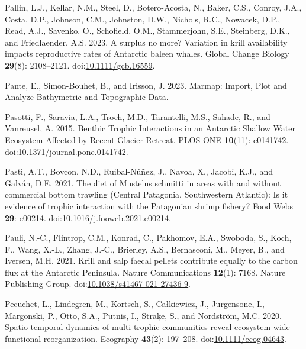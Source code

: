 \documentclass[
]{article}
\newlength{\cslhangindent}
\newenvironment{CSLReferences}[2] %
 {\begin{list}{}{%
  \setlength{\itemindent}{0pt}
  \setlength{\leftmargin}{0pt}
  \setlength{\parsep}{0pt}
  \ifodd #1
   \setlength{\leftmargin}{\cslhangindent}
   \setlength{\itemindent}{-1\cslhangindent}
  \fi
  \setlength{\itemsep}{#2\baselineskip}}}
 {\end{list}}
\begin{document}
\begin{CSLReferences}{1}{0}
Pallin, L.J., Kellar, N.M., Steel, D., Botero-Acosta, N., Baker, C.S.,
Conroy, J.A., Costa, D.P., Johnson, C.M., Johnston, D.W., Nichols, R.C.,
Nowacek, D.P., Read, A.J., Savenko, O., Schofield, O.M., Stammerjohn,
S.E., Steinberg, D.K., and Friedlaender, A.S. 2023. A surplus no more?
{Variation} in krill availability impacts reproductive rates of
{Antarctic} baleen whales. Global Change Biology \textbf{29}(8):
2108--2121.
doi:\href{https://doi.org/10.1111/gcb.16559}{10.1111/gcb.16559}.

Pante, E., Simon-Bouhet, B., and Irisson, J. 2023. Marmap: {Import},
{Plot} and {Analyze Bathymetric} and {Topographic Data}.

Pasotti, F., Saravia, L.A., Troch, M.D., Tarantelli, M.S., Sahade, R.,
and Vanreusel, A. 2015. Benthic {Trophic Interactions} in an {Antarctic
Shallow Water Ecosystem Affected} by {Recent Glacier Retreat}. PLOS ONE
\textbf{10}(11): e0141742.
doi:\href{https://doi.org/10.1371/journal.pone.0141742}{10.1371/journal.pone.0141742}.

Pasti, A.T., Bovcon, N.D., Ruibal-Núñez, J., Navoa, X., Jacobi, K.J.,
and Galván, D.E. 2021. The diet of {Mustelus} schmitti in areas with and
without commercial bottom trawling ({Central Patagonia}, {Southwestern
Atlantic}): {Is} it evidence of trophic interaction with the
{Patagonian} shrimp fishery? Food Webs \textbf{29}: e00214.
doi:\href{https://doi.org/10.1016/j.fooweb.2021.e00214}{10.1016/j.fooweb.2021.e00214}.

Pauli, N.-C., Flintrop, C.M., Konrad, C., Pakhomov, E.A., Swoboda, S.,
Koch, F., Wang, X.-L., Zhang, J.-C., Brierley, A.S., Bernasconi, M.,
Meyer, B., and Iversen, M.H. 2021. Krill and salp faecal pellets
contribute equally to the carbon flux at the {Antarctic Peninsula}.
Nature Communications \textbf{12}(1): 7168. Nature Publishing Group.
doi:\href{https://doi.org/10.1038/s41467-021-27436-9}{10.1038/s41467-021-27436-9}.

Pecuchet, L., Lindegren, M., Kortsch, S., Całkiewicz, J., Jurgensone,
I., Margonski, P., Otto, S.A., Putnis, I., Strāķe, S., and Nordström,
M.C. 2020. Spatio-temporal dynamics of multi-trophic communities reveal
ecosystem-wide functional reorganization. Ecography \textbf{43}(2):
197--208.
doi:\href{https://doi.org/10.1111/ecog.04643}{10.1111/ecog.04643}.


\end{CSLReferences}
\end{document}
